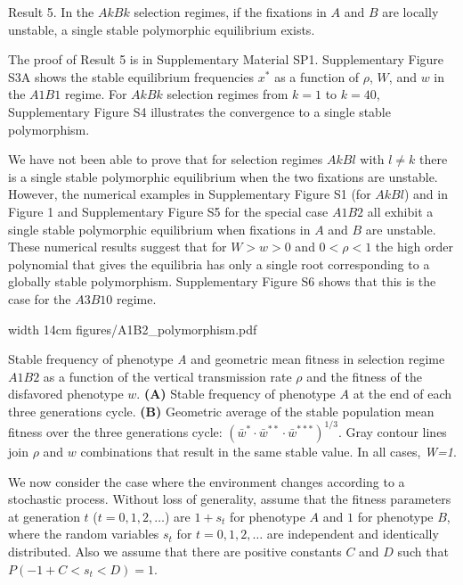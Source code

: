 \proclaim Result 5. In the $AkBk$ selection regimes, if the fixations in $A$ and $B$ are locally unstable, a single stable polymorphic equilibrium exists.\par

The proof of Result 5 is in Supplementary Material SP1.  Supplementary Figure S3A shows the stable equilibrium frequencies $x^*$ as a function of $\rho$, $W$, and $w$ in the $A1B1$ regime.
For $AkBk$ selection regimes from $k=1$ to $k=40$, Supplementary Figure S4 illustrates the convergence to a single stable polymorphism. 

We have not been able to prove that for selection regimes $AkBl$ with $l\ne k$ there is a single stable polymorphic equilibrium when the two fixations are unstable. However, the numerical examples in Supplementary Figure S1 (for $AkBl$) and in Figure 1 and Supplementary Figure S5 for the special case $A1B2$ all exhibit a single stable polymorphic equilibrium when fixations in $A$ and $B$ are unstable. These numerical results suggest that for $W>w>0$ and $0<\rho<1$ the high order polynomial that gives the equilibria has only a single root corresponding to a globally stable polymorphism. Supplementary Figure S6 shows that this is the case for the $A3B10$ regime.
\medskip

\pdfximage width 14cm {figures/A1B2_polymorphism.pdf}
\pdfrefximage\pdflastximage
\centerline{
Stable frequency of phenotype {\sl A} and geometric mean fitness in selection regime
$A1B2$ as a function of the vertical transmission rate \(\rho\) and the fitness of the disfavored phenotype \(w\).
{\bf (A)} Stable frequency of phenotype $A$ at the end of each three generations cycle.
{\bf (B)} Geometric average of the stable population mean fitness over the three generations cycle: $(\bar{w}^* \cdot \bar{w}^{**} \cdot \bar{w}^{***})^{1/3}$.
Gray contour lines join \(\rho\) and \(w\) combinations that result in the same stable value.
In all cases, \emph{W=1}.
}
\bigskip
 
 \smallskip
 
 We now consider the  case where the environment changes according to a stochastic process. Without loss of generality, assume that the fitness parameters at generation $t$ ($t=0,1,2,\dots$) are $1+s_t$ for phenotype $A$ and $1$ for phenotype $B$, where the random variables $s_t$ for $t=0,1,2,\dots$ are independent and identically distributed. Also we assume that there are positive constants $C$ and $D$ such that $P(-1+C<s_t <D)=1$.
 
